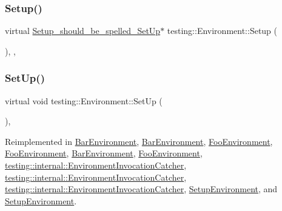 \subsubsection{\texorpdfstring{Setup()}{Setup()}\hspace{0.1cm}{\footnotesize\ttfamily [1/3]}}
{\footnotesize\ttfamily virtual \mbox{\hyperlink{structtesting_1_1_environment_1_1_setup__should__be__spelled___set_up}{Setup\+\_\+should\+\_\+be\+\_\+spelled\+\_\+\+Set\+Up}}$\ast$ testing\+::\+Environment\+::\+Setup (\begin{DoxyParamCaption}{ }\end{DoxyParamCaption})\hspace{0.3cm}{\ttfamily [inline]}, {\ttfamily [private]}, {\ttfamily [virtual]}}

\mbox{\label{classtesting_1_1_environment_a1bf8cafaa9d4eba9feb98655ee434eb3}} 
\subsubsection{\texorpdfstring{SetUp()}{SetUp()}\hspace{0.1cm}{\footnotesize\ttfamily [2/3]}}
{\footnotesize\ttfamily virtual void testing\+::\+Environment\+::\+Set\+Up (\begin{DoxyParamCaption}{ }\end{DoxyParamCaption})\hspace{0.3cm}{\ttfamily [inline]}, {\ttfamily [virtual]}}



Reimplemented in \mbox{\hyperlink{class_bar_environment_a8c525317fe8067f5000475cf4689da09}{Bar\+Environment}}, \mbox{\hyperlink{class_bar_environment_a8c525317fe8067f5000475cf4689da09}{Bar\+Environment}}, \mbox{\hyperlink{class_foo_environment_abf6a0edbb3be025e9f143a7a1b89f9dd}{Foo\+Environment}}, \mbox{\hyperlink{class_foo_environment_abf6a0edbb3be025e9f143a7a1b89f9dd}{Foo\+Environment}}, \mbox{\hyperlink{class_bar_environment_a88e17c5dd1dcea7a4538f2f3c6bf7bdd}{Bar\+Environment}}, \mbox{\hyperlink{class_foo_environment_a7db8d8b312805aff437ae8534132a56d}{Foo\+Environment}}, \mbox{\hyperlink{classtesting_1_1internal_1_1_environment_invocation_catcher_a95400d20847acd38742ba372f87240dc}{testing\+::internal\+::\+Environment\+Invocation\+Catcher}}, \mbox{\hyperlink{classtesting_1_1internal_1_1_environment_invocation_catcher_a95400d20847acd38742ba372f87240dc}{testing\+::internal\+::\+Environment\+Invocation\+Catcher}}, \mbox{\hyperlink{classtesting_1_1internal_1_1_environment_invocation_catcher_a325365b0ecfa71a4a767d7a1817c9663}{testing\+::internal\+::\+Environment\+Invocation\+Catcher}}, \mbox{\hyperlink{class_setup_environment_a02995e3c2581a49c9dd0526d80072b38}{Setup\+Environment}}, and \mbox{\hyperlink{class_setup_environment_a02995e3c2581a49c9dd0526d80072b38}{Setup\+Environment}}.

